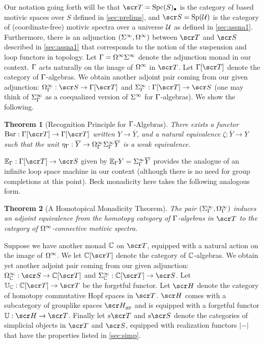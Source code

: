 \documentclass{amsart}
\newtheorem{thm}{Theorem}[section]
\theoremstyle{definition}
\begin{document}
Our notation going forth will be that $\sT=\mathrm{Spc}(S)_{\bu}$ is the category of based motivic spaces over $S$ defined in \ref{sec:prelims}, and $\sS = \mathrm{Sp}(\oU)$ is the category of (coordinate-free) motivic spectra over a universe ${\mathcal{U}}$ as defined in \ref{sec:assna1}. Furthermore, there is an adjunction $(\Sigma^{\infty},\Omega^{\infty})$ between $\sT$ and $\sS$ described in \ref{sec:assna1} that corresponds to the notion of the suspension and loop functors in topology. Let $\Gamma = \Omega^{\infty}\Sigma^{\infty}$ denote the adjunction monad in our context. $\Gamma$ acts naturally on the image of $\Omega^{\infty}$ in $\sT$. Let $\GA[\sT]$ denote the category of $\Gamma$-algebras. We obtain another adjoint pair coming from our given adjunction:
$\OM_{\GA}^{\infty} : \sS \to \GA[\sT]$ and $\SI_{\GA}^{\infty} : \GA[\sT] \to \sS$ (one may think of $\Sigma_{\Gamma}^{\infty}$ as a coequalized version of $\Sigma^{\infty}$ for $\Gamma$-algebras). We show the following.

\begin{thm}[Recognition Principle for $\Gamma$-Algebras]\label{thm:recogprincip}
There exists a functor $\mathrm{Bar}:\GA[\sT]\to \GA[\sT]$ written $Y \to \overline{Y}$, and a natural equivalence $\zeta: \overline{Y} \to Y$ such that the unit $\eta_{\Gamma} : \overline{Y} \to \Omega^{\infty}_{\Gamma} \Sigma^{\infty}_{\Gamma}\overline{Y}$ is a weak equivalence.
\end{thm}

$\bE_{\GA} : \GA[\sT] \to \sS$ given by $\mathbb{E}_{\Gamma}Y = \Sigma_{\Gamma}^{\infty}\overline{Y}$ provides the analogue of an infinite loop space machine in our context (although there is no need for group completions at this point). Beck monadicity here takes the following analogous form.

\begin{thm}[A Homotopical Monadicity Theorem]\label{thm:charprinc}
The pair $(\Sigma_{\Gamma}^{\infty},\Omega_{\Gamma}^{\infty})$ induces an adjoint equivalence from the homotopy category of $\Gamma$-algebras in $\sT$ to the category of $\Omega^{\infty}$-connective motivic spectra.
\end{thm}

Suppose we have another monad $\mathbb{C}$ on $\sT$, equipped with a natural action on the image of $\Omega^{\infty}$. We let $\bC[\sT]$ denote the category of $\mathbb{C}$-algebras. We obtain yet another adjoint pair coming from our given adjunction: $\OM_{\bC}^{\infty} : \sS \to \bC[\sT]$ and $\SI_{\bC}^{\infty} : \bC[\sT] \to \sS$. Let $\bU_{\bC} : \bC[\sT] \to \sT$ be the forgetful functor. Let $\sH$ denote the category of homotopy commutative Hopf spaces in $\sT$. $\sH$ comes with a subcategory of grouplike spaces $\sH_{gp}$ and is equipped with a forgetful functor $\bU:\sH \to \sT$. Finally let $s\sT$ and $s\sS$ denote the categories of simplicial objects in $\sT$ and $\sS$, equipped with realization functors $|-|$ that have the properties listed in \ref{sec:simp}.
\end{document}
